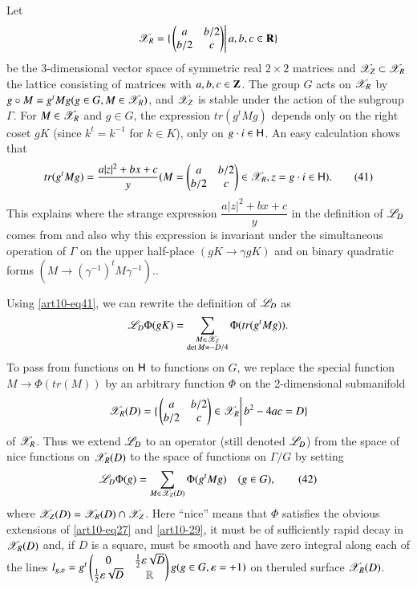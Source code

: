 Let\pageoriginale
$$
\mathscr{X}_R = \{
\left.
\left(\begin{matrix}
a & b/2\\
b/2 & c
\end{matrix} 
\right) \right| a, b, c \in \mathbf{R}
\}
$$
be the 3-dimensional vector space of symmetric real $2 \times 2$ matrices and $\mathscr{X}_Z \subset \mathscr{X}_R$ the lattice consisting of matrices with $a, b, c \in \mathbf{Z}$. The group $G$ acts on $\mathscr{X}_R$ by $g \circ M = g^t Mg (g \in G , M \in \mathscr{X}_R)$, and $\mathscr{X}_Z$ is stable under the action of the subgroup $\Gamma$. For $M \in \mathscr{X}_R$ and $g \in G$, the expression $tr (g^t Mg)$ depends only on the right coset $g K$ (since $k^t = k^{-1}$ for $k \in K$), \ie only on $g \cdot i \in \mathsf{H}$. An easy calculation shows that 
\begin{equation*}
tr (g^t Mg) = \frac{a|z|^2 + b x + c}{y} (M = \left(\begin{matrix}
a & b/2\\
b/2 & c
\end{matrix}
\right) \in \mathscr{X}_R, z = g \cdot i \in \mathsf{H}).\tag{41}
\label{art10-eq41}
\end{equation*}
This explains where the strange expression $\dfrac{a|z|^2 + b x + c}{y}$ in the definition of $\mathscr{L}_D$ comes from and also why this expression is invariant under the simultaneous operation of $\Gamma$ on the upper half-place $(gK \to \gamma g K)$ and on binary quadratic forms $(M \to (\gamma^{-1})^t M \gamma^{-1})$..

Using \eqref{art10-eq41}, we can rewrite the definition of $\mathscr{L}_D$ as 
$$
\mathscr{L}_D \Phi (gK) = \sum\limits_{\substack{M \in \mathscr{X}_Z\\\det M = - D /4}} \Phi (tr (g^t M g)).
$$
To pass from functions on $\mathsf{H}$ to functions on $G$, we replace the special function $M \to \Phi (tr (M))$ by an arbitrary function $\Phi$ on the 2-dimensional submanifold
$$
\mathscr{X}_R (D) = \{
\left.
\left( 
\begin{matrix}
a & b/2\\
b/2& c
\end{matrix}
\right)
 \in \mathscr{X}_R \right| b^2 - 4 a c = D \}
$$
of $\mathscr{X}_R$. Thus we extend $\mathscr{L}_D$ to an operator (still denoted $\mathscr{L}_D$) from the space of nice functions on $\mathscr{X}_R (D)$ to the space of functions on $\Gamma / G$ by setting 
\begin{equation*}
\mathscr{L}_D \Phi (g) =\sum\limits_{M\in \mathscr{X}_Z (D)} \Phi (g^t Mg) \quad (g \in G), \tag{42}\label{art10-eq42}
\end{equation*}
where $\mathscr{X}_Z (D) = \mathscr{X}_R (D) \cap \mathscr{X}_Z$. Here ``nice'' means that $\Phi$ satisfies the obvious extensions of \eqref{art10-eq27} and \eqref{art10-29}, \ie it must be of sufficiently rapid decay in $\mathscr{X}_R (D)$ and, if $D$ is a square, must be smooth and have zero integral along each of the lines $l_{g, \varepsilon} = g^t \left(
\begin{matrix}
0 & \frac{1}{2} \varepsilon \sqrt{D}\\
\frac{1}{2} \varepsilon \sqrt{D} & \mathbb{R}
\end{matrix}
\right) g (g \in G, \varepsilon = +1)$ on the\pageoriginale ruled surface $\mathscr{X}_R(D)$.


